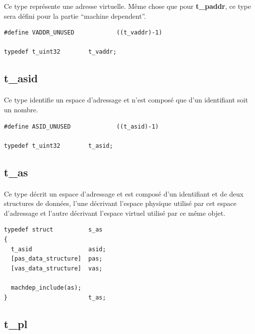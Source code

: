 \documentclass[10pt,a4wide]{article}
\begin{document}
Ce type repr\'esente une adresse virtuelle. M\^eme chose que pour
\textbf{t\_paddr}, ce type sera d\'efini pour la partie ``machine dependent''.

\begin{verbatim}
#define VADDR_UNUSED            ((t_vaddr)-1)

typedef t_uint32        t_vaddr;
\end{verbatim}

\subsection{t\_asid}

\paragraph{}

Ce type identifie un espace d'adressage et n'est compos\'e que
d'un identifiant soit un nombre.

\begin{verbatim}
#define ASID_UNUSED             ((t_asid)-1)

typedef t_uint32        t_asid;
\end{verbatim}

\subsection{t\_as}

\paragraph{}

Ce type d\'ecrit un espace d'adressage et est compos\'e d'un identifiant et
de deux structures de donn\'ees, l'une d\'ecrivant l'espace physique utilis\'e
par cet espace d'adressage et l'autre d\'ecrivant l'espace virtuel utilis\'e
par ce m\^eme objet.

\begin{verbatim}
typedef struct          s_as
{
  t_asid                asid;
  [pas_data_structure]  pas;
  [vas_data_structure]  vas;

  machdep_include(as);
}                       t_as;
\end{verbatim}

\subsection{t\_pl}
\end{document}
